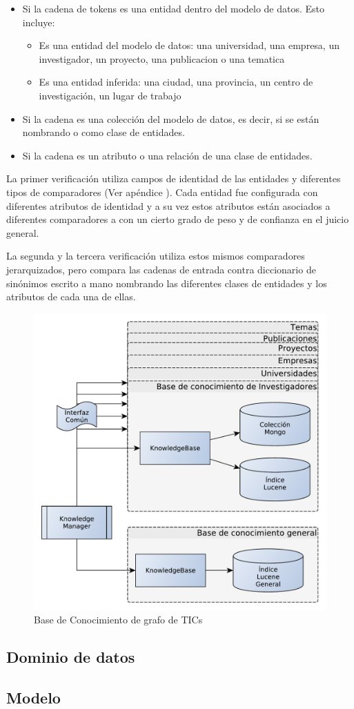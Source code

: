 \begin{itemize}
  \item Si la cadena de tokens es una entidad dentro del modelo de datos. Esto incluye:
    \begin{itemize}
      \item Es una entidad del modelo de datos: una universidad, una empresa, un investigador, un proyecto, una publicacion o una tematica
      \item Es una entidad inferida: una ciudad, una provincia, un centro de investigación, un lugar de trabajo
    \end{itemize}
  \item Si la cadena es una colección del modelo de datos, es decir, si se están nombrando  o  como clase de entidades.
  \item Si la cadena es un atributo o una relación de una clase de entidades.
\end{itemize}

La primer verificación utiliza campos de identidad de las entidades y diferentes tipos de comparadores (Ver apéndice  ). Cada entidad fue configurada con diferentes atributos de identidad y a su vez estos atributos están asociados a diferentes comparadores a con un cierto grado de peso y de confianza en el juicio general. 

La segunda y la tercera verificación utiliza estos mismos comparadores jerarquizados, pero compara las cadenas de entrada contra diccionario de sinónimos escrito a mano nombrando las diferentes clases de entidades y los atributos de cada una de ellas. 

\begin{figure}[H]
  \centering
    \includegraphics[scale=0.5]{graficos/KnowledgeManager}
  \caption{Base de Conocimiento de grafo de TICs}
  \label{fig:KnowledgeManager}
\end{figure}

\bigskip
\subsection{Dominio de datos}
\subsection{Modelo}
